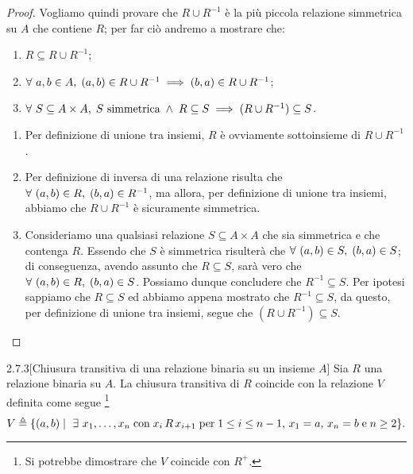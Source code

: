 \begin{proof}
Vogliamo quindi provare che $R \cup R^{-1}$ è la più piccola relazione simmetrica su $A$ che contiene $R$; per far ciò andremo a mostrare che:
\begin{enumerate}
\item $R \subseteq R \cup R^{-1}$;
\item $\forall \ a,b \in A ,\; 
	(a,b) \in R \cup R^{-1} 
	\implies (b,a) \in R \cup R^{-1}$;
\item $\forall \ S \subseteq A \times A ,\;
	S \ \text{simmetrica} \; \land \; R \subseteq S
	\implies (R \cup R^{-1}) \subseteq S$.
\end{enumerate}

\begin{enumerate}[leftmargin=*]
\item Per definizione di unione tra insiemi, $R$ è ovviamente sottoinsieme di $R \cup R^{-1}$.
\item Per definizione di inversa di una relazione risulta che 
$\forall \ (a,b) \in R ,\; (b, a) \in R^{-1}$, ma allora, per definizione di unione tra insiemi, abbiamo che $R \cup R^{-1}$ è sicuramente simmetrica.
\item Consideriamo una qualsiasi relazione $S \subseteq A \times A$ che sia simmetrica e che contenga $R$. Essendo che $S$ è simmetrica risulterà che $\forall \ (a,b) \in S ,\; (b,a) \in S$; di conseguenza, avendo assunto che $R \subseteq S$, sarà vero che $\forall \ (a,b) \in R ,\; (b,a) \in S$. Possiamo dunque concludere che $R^{-1} \subseteq S$.
Per ipotesi sappiamo che $R \subseteq S$ ed abbiamo appena mostrato che $R^{-1} \subseteq S$,
da questo, per definizione di unione tra insiemi, segue che $(R \cup R^{-1}) \subseteq S$.
\end{enumerate}
\end{proof}

\begin{customthm}{2.7.3}[Chiusura transitiva di una relazione binaria su un insieme $A$]
\label{th:2.7.3}
Sia $R$ una relazione binaria su $A$.
La chiusura transitiva di $R$ coincide con la relazione $V$ definita come segue 
\footnote{Si potrebbe dimostrare che $V$ coincide con $R^+$.} \[
	V \triangleq \{(a, b) \mid 
	\ \exists \ x_1, \ldots, x_n 
	\; \text{con} \; x_i \, R \, x_{i+1} \; \text{per} \; 1 \leq i \leq n-1 \text{,} 
	\ x_1 = a \text{,} \ x_n = b \; \text{e} \; n \geq 2
	\}.
\]
\end{customthm}

